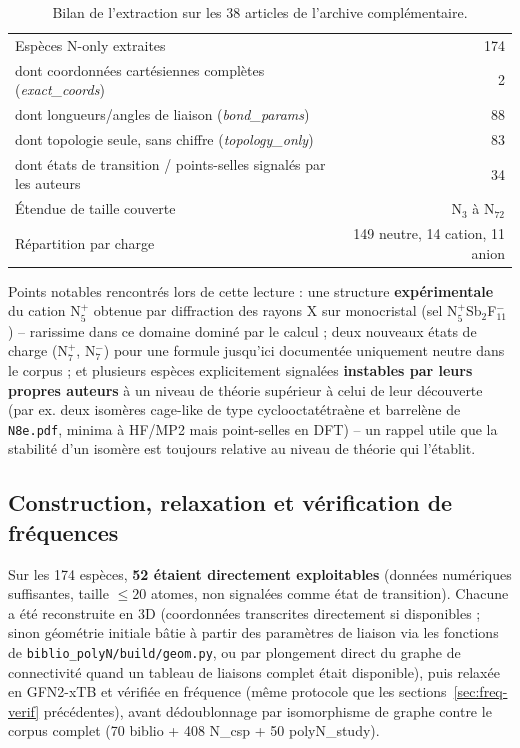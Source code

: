 \documentclass[11pt,a4paper]{article}
\begin{document}
\begin{table}[H]
\centering
\begin{tabular}{lr}
\toprule
Esp\`eces N-only extraites & 174 \\
\quad dont coordonn\'ees cart\'esiennes compl\`etes (\emph{exact\_coords}) & 2 \\
\quad dont longueurs/angles de liaison (\emph{bond\_params}) & 88 \\
\quad dont topologie seule, sans chiffre (\emph{topology\_only}) & 83 \\
\quad dont \'etats de transition / points-selles signal\'es par les auteurs & 34 \\
\'Etendue de taille couverte & N$_3$ \`a N$_{72}$ \\
R\'epartition par charge & 149 neutre, 14 cation, 11 anion \\
\bottomrule
\end{tabular}
\caption{Bilan de l'extraction sur les 38 articles de l'archive
compl\'ementaire.}
\label{tab:archive-extraction}
\end{table}

Points notables rencontr\'es lors de cette lecture : une structure
\textbf{exp\'erimentale} du cation N$_5^{+}$ obtenue par diffraction des
rayons X sur monocristal (sel N$_5^{+}$Sb$_2$F$_{11}^{-}$) -- rarissime
dans ce domaine domin\'e par le calcul ; deux nouveaux \'etats de charge
(N$_7^{+}$, N$_7^{-}$) pour une formule jusqu'ici document\'ee uniquement
neutre dans le corpus ; et plusieurs esp\`eces explicitement signal\'ees
\textbf{instables par leurs propres auteurs} \`a un niveau de th\'eorie
sup\'erieur \`a celui de leur d\'ecouverte (par ex. deux isom\`eres
cage-like de type cyclooctat\'etra\`ene et barrel\`ene de
\texttt{N8e.pdf}, minima \`a HF/MP2 mais point-selles en DFT) -- un
rappel utile que la stabilit\'e d'un isom\`ere est toujours relative au
niveau de th\'eorie qui l'\'etablit.

\subsection{Construction, relaxation et v\'erification de fr\'equences}

Sur les 174 esp\`eces, \textbf{52 \'etaient directement exploitables}
(donn\'ees num\'eriques suffisantes, taille $\leq 20$ atomes, non
signal\'ees comme \'etat de transition). Chacune a \'et\'e reconstruite en
3D (coordonn\'ees transcrites directement si disponibles ; sinon
g\'eom\'etrie initiale b\^atie \`a partir des param\`etres de liaison via
les fonctions de \texttt{biblio\_polyN/build/geom.py}, ou par plongement
direct du graphe de connectivit\'e quand un tableau de liaisons complet
\'etait disponible), puis relax\'ee en GFN2-xTB et v\'erifi\'ee en
fr\'equence (m\^eme protocole que les sections~\ref{sec:freq-verif}
pr\'ec\'edentes), avant d\'edoublonnage par isomorphisme de graphe contre
le corpus complet (70 biblio + 408 N\_csp + 50 polyN\_study).
\end{document}
